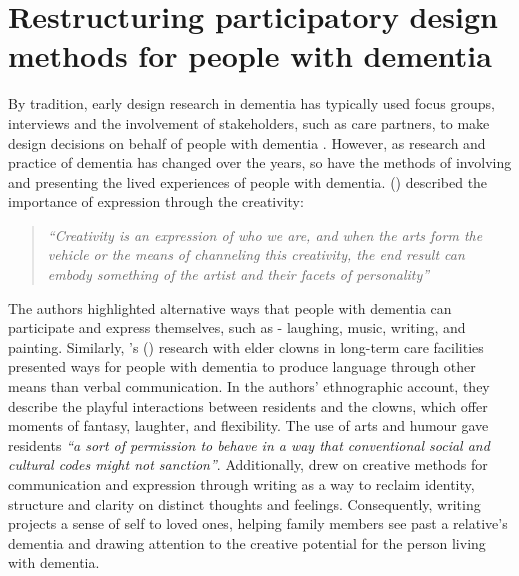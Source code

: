 \section{Restructuring participatory design methods for people with dementia}
\label{method:DementiaPD}
By tradition, early design research in dementia has typically used focus groups, interviews and the involvement of stakeholders, such as care partners, to make design decisions on behalf of people with dementia \citep{branco_personalised_2017}. However, as research and practice of dementia has changed over the years, so have the methods of involving and presenting the lived experiences of people with dementia. \citeauthor{john_killick_claire_craig_creativity_2012} (\citeyear{john_killick_claire_craig_creativity_2012}) described the importance of expression through the creativity: 

\begin{quote}\textit{``Creativity is an expression of who we are, and when the arts form the vehicle or the means of channeling this creativity, the end result can embody something of the artist and their facets of personality''} \citep[p.17]{john_killick_claire_craig_creativity_2012}
\end{quote}

The authors highlighted alternative ways that people with dementia can participate and express themselves, such as - laughing, music, writing, and painting. Similarly, \citeauthor{kontos_presence_2015}'s (\citeyear{kontos_presence_2015}) research with elder clowns in long-term care facilities presented ways for people with dementia to produce language through other means than verbal communication. In the authors' ethnographic account, they describe the playful interactions between residents and the clowns, which offer moments of fantasy, laughter, and flexibility. The use of arts and humour gave residents \textit{``a sort of permission to behave in a way that conventional social and cultural codes might not sanction''}. Additionally, \cite{ryan_dementia_2009} drew on creative methods for communication and expression through writing as a way to reclaim identity, structure and clarity on distinct thoughts and feelings. Consequently, writing projects a sense of self to loved ones, helping family members see past a relative's dementia and drawing attention to the creative potential for the person living with dementia. 

